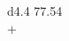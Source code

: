 \documentclass[border = 1mm]{standalone}
\begin{document}
    
\begin{tabular}{d{4.4}}
    77.54 \\
    + \\
     \\
    \hline\\
\end{tabular}
\end{document}
